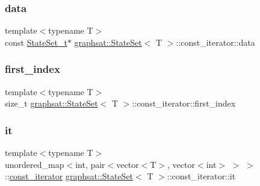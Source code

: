 \subsubsection{\texorpdfstring{data}{data}}
{\footnotesize\ttfamily template$<$typename T$>$ \\
const \mbox{\hyperlink{classgraphsat_1_1_state_set_a6474a59203fade7146aacfd0e277ecf4}{State\+Set\+\_\+t}}$\ast$ \mbox{\hyperlink{classgraphsat_1_1_state_set}{graphsat\+::\+State\+Set}}$<$ T $>$\+::const\+\_\+iterator\+::data\hspace{0.3cm}{\ttfamily [protected]}}

\mbox{\label{classgraphsat_1_1_state_set_1_1const__iterator_ab001a4dd8835b77d975ae3b41823a8d5}} 
\subsubsection{\texorpdfstring{first\_index}{first\_index}}
{\footnotesize\ttfamily template$<$typename T$>$ \\
size\+\_\+t \mbox{\hyperlink{classgraphsat_1_1_state_set}{graphsat\+::\+State\+Set}}$<$ T $>$\+::const\+\_\+iterator\+::first\+\_\+index\hspace{0.3cm}{\ttfamily [protected]}}

\mbox{\label{classgraphsat_1_1_state_set_1_1const__iterator_a60ff6f8b830f8b5107a4e910bbb037db}} 
\subsubsection{\texorpdfstring{it}{it}}
{\footnotesize\ttfamily template$<$typename T$>$ \\
unordered\+\_\+map$<$int, pair$<$vector$<$T$>$, vector$<$int$>$ $>$ $>$\+::\mbox{\hyperlink{classgraphsat_1_1_state_set_1_1const__iterator}{const\+\_\+iterator}} \mbox{\hyperlink{classgraphsat_1_1_state_set}{graphsat\+::\+State\+Set}}$<$ T $>$\+::const\+\_\+iterator\+::it\hspace{0.3cm}{\ttfamily [protected]}}

